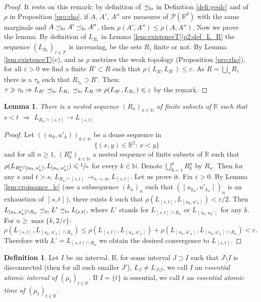 \documentclass[JEP,XML,SOM,Unicode,NoEqCountersInSection,NoFloatCountersInSection,published]{cedram}
\theoremstyle{plain}
\newtheorem{lem}[them]{Lemma}
\theoremstyle{definition}
\newtheorem{defi}[them]{Definition}
\newcommand{\Tt}{{\mathcal T}}
\let\eps\varepsilon
\newcommand{\p}{\mathcal{P}}
\newcommand{\R}{\mathbb{R}}
\newcommand{\N}{\mathbb{N}}
\newcommand{\op}{\mathopen}
\newcommand{\clo}{\mathclose}
\newcommand{\leqlc}{\preceq_{\rm lo}}
\begin{document}
\begin{proof} It rests on this remark: by definition of $\leqlc$ in Definition \ref{defi:geqlc} and of $\rho$ in Proposition \ref{pro:rho}, if $A$, $A'$, $A''$ are measures of $\p(\R^d)$ with the same marginals and $A\leqlc A'\leqlc A''$, then $\rho(A',A'')\leqslant\rho(A,A'')$. Now we prove the lemma. By definition of $L_{R_\tau}$ in Lemma \ref{lem:existenceT}\eqref{p2:def_L_R} the sequence $(L_{R_\tau})_{\tau\in\Tt}$ is increasing, be the sets $R_\tau$ finite or not. By Lemma \ref{lem:existenceT}(c), and as $\rho$ metrizes the weak topology (Proposition \ref{pro:rho}), for all $\eps>0$ we find a finite $R'\subset R$ such that $\rho(L_R,L_{R'})\leqslant\eps$. As $R=\bigcup_\tau R_\tau$ there is a $\tau_0$ such that $R_{\tau_0}\supset R'$. Then: $\tau\geqslant \tau_0\Rightarrow L_{R'}\leqlc L_{R_\tau}\leqlc L_{R}\Rightarrow \rho(L_{R'},L_{R_\tau})\leqslant\eps$ by the remark.
\end{proof}

\begin{lem}\label{lem:convergence_couples}
There is a nested sequence $(R_n)_{n\in\N}$ of finite subsets of $\R$ such that $s<t$ $\Rightarrow$ $L_{R_n\cap\op]s,t\clo[}\to L_{\op]s,t\clo[}$
\end{lem}
\begin{proof} Let $((u_k,u'_k))_{k\in\N}$ be a dense sequence in
\[
\{(x,y)\in\R^2:\,x< y\}
\]
and for all $n\geq 1$, $(R_k^n)_{k\in\N}$ a nested sequence of finite subsets of $\R$ such that $\rho(L_{R_k^n\cap\op]u_k,u'_k\clo[},L_{\op]u_k,u'_k\clo[})\leqslant\sfrac1n$ for every $k\in \N$. Denote $\bigcup_{k=1}^n R^n_k$ by $R_n$. Then for any $s$ and $t>s$, $L_{R_n\cap\op]s,t\clo[}\to_{n\to\infty}L_{\op]s,t\clo[}$. Let us prove it. Fix $\eps>0$. By Lemma \ref{lem:croissance_lc} (use a subsequence $(k_n)_n$ such that $(\op]u_{k_n},u'_{k_n}\clo[)_n$ is an exhaustion of $\op]s,t\clo[$), there exists $k$ such that $\rho(L_{\op]s,t\clo[},L_{\op]u_k,u'_k\clo[})<\eps/2$. Then $L_{\op]u_k,u_k'\clo[\cap R_n}\leqlc L' \leqlc L_{\op]s,t\clo[}$, where $L'$ stands for $L_{\op]s,t\clo[\cap R_n}$ or $L_{\op]u_k,u_k'\clo[}$ for any $k$. For $n\geq\max\{k,2/\eps\}$:
\[\rho(L_{\op]s,t\clo[},L_{\op]u_k,u'_k\clo[\cap R_n})\leq \rho(L_{\op]s,t\clo[},L_{\op]u_k,u'_k\clo[})+ \rho(L_{\op]u_k,u'_k\clo[},L_{\op]u_k,u'_k\clo[\cap R_n})<\eps.\]
Therefore with $L'=L_{\op]s,t\clo[\cap R_n}$ we obtain the desired convergence to $L_{\op]s,t\clo[}$.
\end{proof}

\begin{defi}\label{defi:essentiel}Let $I$ be an interval. If, for some interval $J\supset I$ such that $J\setminus I$ is disconnected (then for all such smaller $J'$), $L_{J}\neq L_{J\setminus I}$, we call $I$ an \emph{essential atomic interval of $(\mu_t)_{t\in\R}$}. If $I=\{t\}$ is essential, we call $t$ an \emph{essential atomic time of $(\mu_t)_{t\in\R}$}.
\end{defi}
\end{document}
